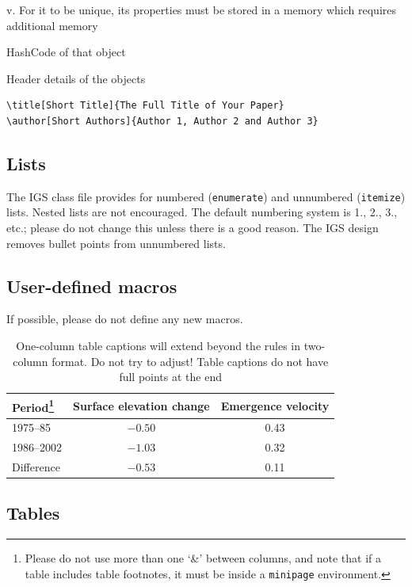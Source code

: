 \documentclass[aog]{igs}
\begin{document}
    v.  For it to be unique, its properties must be stored in a memory which requires additional memory 
		    
		    HashCode of that object

      Header details of the objects
		    
		    

\begin{verbatim}
\title[Short Title]{The Full Title of Your Paper}
\author[Short Authors]{Author 1, Author 2 and Author 3}
\end{verbatim}

\subsection{Lists}
The IGS class file provides for numbered (\verb"enumerate") and unnumbered (\verb"itemize") lists. Nested lists are not encouraged. The default numbering system is 1., 2., 3., etc.; please do not change this unless there is a good reason. The IGS design removes bullet points from unnumbered lists.

\subsection{User-defined macros}
If possible, please do not define any new macros.

\begin{table}%
\caption{One-column table captions will extend beyond
  the rules in two-column format. Do not try to adjust!
  Table captions do not have full points at the end}
\label{period}
\begin{minipage}{86mm}%
\begin{tabular}{@{}lcc}\hline
Period\footnote{Please do not use more than one `\&' 
  between columns, and note that if a table includes 
  table footnotes, it must be inside a \texttt{minipage} 
  environment.}%
  & Surface elevation change
  & Emergence velocity\\ \hline
1975--85   & $-0.50$ & 0.43\\
1986--2002 & $-1.03$ & 0.32\\
Difference & $-0.53$ & \llap{$-$}0.11
\end{tabular}
\end{minipage}%
\end{table}

\subsection{Tables}
\end{document}
